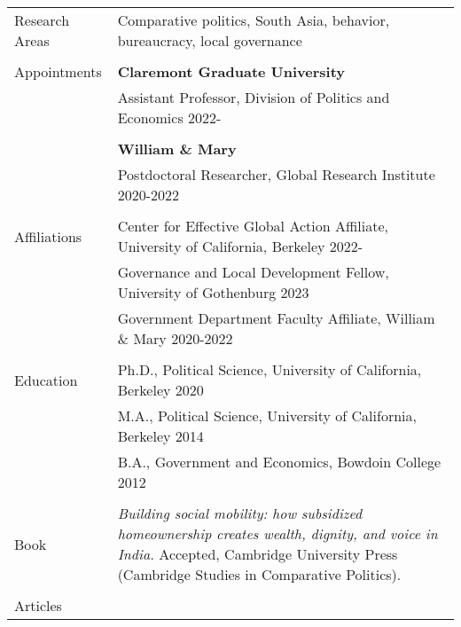 \documentclass[letterpaper, 10.5pt]{article}
\begin{document}
\begin{longtable}{p{1.5in}p{5in}}

Research Areas & Comparative politics, South Asia,  behavior, bureaucracy, local governance \\
& \\
Appointments 
& \textbf{Claremont Graduate University} \hfill  \\
& Assistant Professor, Division of Politics and Economics \hfill  2022-\\

& \\

& \textbf{William \& Mary} \hfill \\
& Postdoctoral Researcher, Global Research Institute \hfill 2020-2022 \\


& \\

Affiliations & Center for Effective Global Action Affiliate, University of California,  Berkeley \hfill 2022-\\ 
& Governance and Local Development Fellow, University of Gothenburg \hfill 2023\\


& Government Department Faculty Affiliate, William \& Mary \hfill 2020-2022  \\
& \\
{Education} 
&Ph.D., Political Science, University of California, Berkeley \hfill 2020 \\


& M.A., Political Science, University of California, Berkeley \hfill 2014 \\
& B.A., Government and Economics, Bowdoin College  \hfill 2012 \\

& \\

Book &  \textit{Building social mobility: how subsidized homeownership creates wealth, dignity, and voice in India.} Accepted, Cambridge University Press (Cambridge Studies in Comparative Politics).\\

& \\

\nohyphens{{Articles}} 


\end{longtable}
\end{document}
